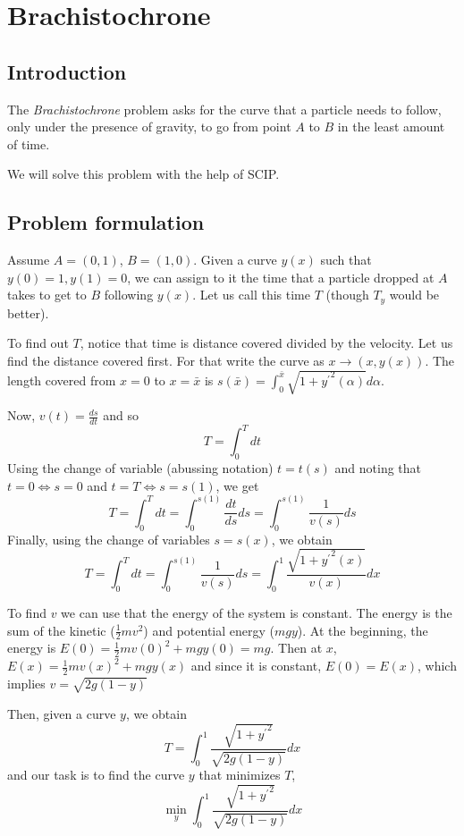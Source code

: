 \documentclass[12pt]{article}
\begin{document}
\section*{Brachistochrone}

\subsection*{Introduction}

The \emph{Brachistochrone} problem asks for the curve that a particle needs to
follow, only under the presence of gravity, to go from point $A$ to $B$ in the
least amount of time.

We will solve this problem with the help of SCIP.

\subsection*{Problem formulation}

Assume $A = (0,1)$, $B = (1,0)$. Given a curve $y(x)$ such that $y(0) = 1, y(1) = 0$, we can assign to it
the time that a particle dropped at $A$ takes to get to $B$ following $y(x)$. Let us call this time $T$
(though $T_y$ would be better).

To find out $T$, notice that time is distance covered divided by the velocity.
Let us find the distance covered first. For that write the curve as $x \to (x, y(x))$.
The length covered from $x = 0$ to $x = \bar x$ is $s(\bar x) = \int_0^{\bar x} \sqrt{1 + {y^{'}}^2(\alpha)} d \alpha$.

Now, $v(t) = \tfrac{ds}{dt}$ and so
\[
    T = \int_0^T dt
\]
Using the change of variable (abussing notation)
$t = t(s)$ and noting that $t = 0 \Leftrightarrow s = 0$ and $t = T \Leftrightarrow s = s(1)$, we get
\[
    T = \int_0^T dt = \int_0^{s(1)} \frac{dt}{ds} ds = \int_0^{s(1)} \frac{1}{v(s)} ds
\]
Finally, using the change of variables $s = s(x)$, we obtain
\[
    T = \int_0^T dt = \int_0^{s(1)} \frac{1}{v(s)} ds = \int_0^{1} \frac{\sqrt{1 + {y^{'}}^2(x)}}{v(x)} dx
\]

To find $v$ we can use that the energy of the system is constant.
The energy is the sum of the kinetic ($\tfrac{1}{2} m v^2$) and potential energy ($m g y$).
At the beginning, the energy is $E(0) = \tfrac{1}{2} m v(0)^2 + m g y(0) = m g$.
Then at $x$, $E(x) = \tfrac{1}{2} m v(x)^2 + m g y(x)$ and since it is constant, $E(0) = E(x)$, which implies
$v = \sqrt{2g(1 - y)}$

Then, given a curve $y$, we obtain
\[
    T = \int_0^1 \frac{\sqrt{1 + {y^{'}}^2}}{\sqrt{2g(1 - y)}} dx
\]
and our task is to find the curve $y$ that minimizes $T$,
\[
    \min_{y} \int_0^1 \frac{\sqrt{1 + {y^{'}}^2}}{\sqrt{2g(1 - y)}} dx
\]
\end{document}

